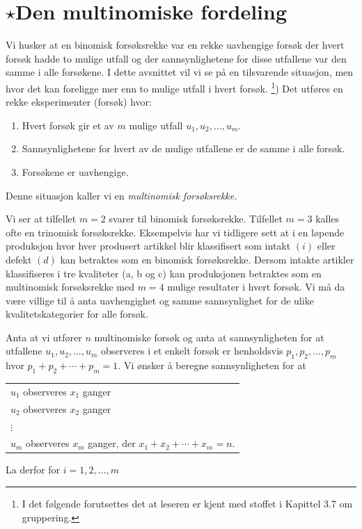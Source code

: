 \section{$\star$Den multinomiske fordeling}
\small

Vi husker at en binomisk forsøksrekke var en rekke uavhengige
forsøk der hvert forsøk hadde to mulige utfall og der
sannsynlighetene for disse utfallene var den samme i alle
forsøkene. I dette avsnittet vil vi se på en tilsvarende
situasjon, men hvor det kan foreligge mer enn to mulige utfall i
hvert forsøk. \footnote{I det følgende forutsettes det at leseren
er kjent med stoffet i Kapittel 3.7 om gruppering.})
Det utføres en rekke eksperimenter (forsøk) hvor:
\begin{enumerate}
\item Hvert forsøk gir et av $m$ mulige utfall $u_1, u_2, \ldots , u_m$.
\item Sannsynlighetene for hvert av de mulige utfallene er de
     samme i alle forsøk.
\item Forsøkene er uavhengige.
\end{enumerate}
Denne situasjon kaller vi en {\em multinomisk forsøksrekke.}

Vi ser at tilfellet $m=2$ svarer til binomisk forsøksrekke.
Tilfellet $m=3$ kalles ofte en trinomisk forsøksrekke.
Eksempelvis har vi tidligere sett at i en løpende produksjon hvor
hver produsert artikkel blir klassifisert som intakt $(i)$ eller
defekt $(d)$ kan betraktes som en binomisk forsøksrekke. Dersom
intakte artikler klassifiseres i tre kvaliteter (a, b og c) kan
produksjonen betraktes som en multinomisk forsøksrekke med $m=4$
mulige resultater i hvert forsøk. Vi må da være villige til å
anta uavhengighet og samme sannsynlighet for de ulike
kvalitetskategorier for alle forsøk.

Anta at vi utfører $n$ multinomiske forsøk og anta at
sannsynligheten for at utfallene $u_1, u_2, \ldots , u_m$ observeres
i et enkelt forsøk er henholdsvis $p_1, p_2, \ldots , p_m$ hvor
$p_1+p_2+\cdots +p_m =1$. Vi ønsker å beregne sannsynligheten for
at
\begin{center}
\begin{tabular}{l}
     $u_1$ observeres $x_1$ ganger\\
     $u_2$ observeres $x_2$ ganger\\
     $\vdots $                     \\
     $u_m$ observeres $x_m$ ganger, der $x_1+x_2+\cdots +x_m=n$.
\end{tabular}
\end{center}
\noindent La derfor for $i=1, 2, \ldots , m$

